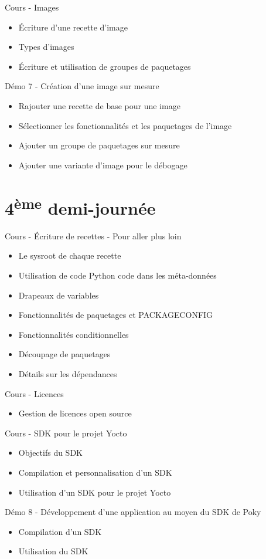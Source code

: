 \documentclass[a4paper,12pt,obeyspaces,spaces,hyphens]{article}
\begin{document}
\feagendatwocolumn
{Cours - Images}
{
  \begin{itemize}
  \item Écriture d'une recette d'image
  \item Types d'images
  \item Écriture et utilisation de groupes de paquetages
  \end{itemize}
}
{Démo 7 - Création d'une image sur mesure}
{
  \begin{itemize}
  \item Rajouter une recette de base pour une image
  \item Sélectionner les fonctionnalités et les paquetages de l'image
  \item Ajouter un groupe de paquetages sur mesure
  \item Ajouter une variante d'image pour le débogage
  \end{itemize}
}

\section{4\textsuperscript{ème} demi-journée}

\feagendatwocolumn
{Cours - Écriture de recettes - Pour aller plus loin}
{
  \begin{itemize}
  \item Le sysroot de chaque recette
  \item Utilisation de code Python code dans les méta-données
  \item Drapeaux de variables
  \item Fonctionnalités de paquetages et PACKAGECONFIG
  \item Fonctionnalités conditionnelles
  \item Découpage de paquetages
  \item Détails sur les dépendances
  \end{itemize}
}
{Cours - Licences}
{
  \begin{itemize}
  \item Gestion de licences open source
  \end{itemize}
}

\feagendatwocolumn
{Cours - SDK pour le projet Yocto}
{
  \begin{itemize}
  \item Objectifs du SDK
  \item Compilation et personnalisation d'un SDK
  \item Utilisation d'un SDK pour le projet Yocto
  \end{itemize}
}
{Démo 8 - Développement d'une application au moyen du SDK de Poky}
{
  \begin{itemize}
  \item Compilation d'un SDK
  \item Utilisation du SDK
  \end{itemize}
}
\end{document}
